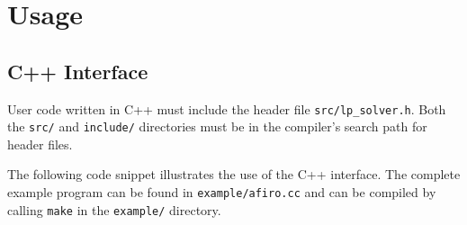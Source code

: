\documentclass{article}
\newcommand{\ct}{\texttt}
\begin{document}
\section{Usage}

\subsection{C++ Interface}
User code written in C++ must include the header file \ct{src/lp\_solver.h}.
Both the \ct{src/} and \ct{include/} directories must be in the compiler's
search path for header files.

The following code snippet illustrates the use of the C++ interface. The
complete example program can be found in \ct{example/afiro.cc} and can be
compiled by calling \ct{make} in the \ct{example/} directory.
\end{document}
